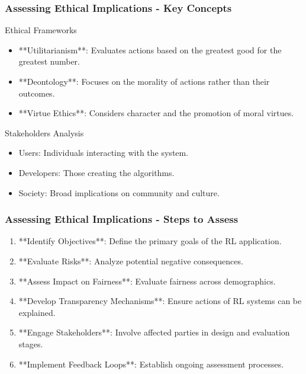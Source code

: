 \documentclass{beamer}
\begin{document}
\begin{frame}[fragile]
    \frametitle{Assessing Ethical Implications - Key Concepts}
    \begin{block}{Ethical Frameworks}
        \begin{itemize}
            \item **Utilitarianism**: Evaluates actions based on the greatest good for the greatest number.
            \item **Deontology**: Focuses on the morality of actions rather than their outcomes.
            \item **Virtue Ethics**: Considers character and the promotion of moral virtues.
        \end{itemize}
    \end{block}
    
    \begin{block}{Stakeholders Analysis}
        \begin{itemize}
            \item Users: Individuals interacting with the system.
            \item Developers: Those creating the algorithms.
            \item Society: Broad implications on community and culture.
        \end{itemize}
    \end{block}
\end{frame}

\begin{frame}[fragile]
    \frametitle{Assessing Ethical Implications - Steps to Assess}
    \begin{enumerate}
        \item **Identify Objectives**: Define the primary goals of the RL application.
        \item **Evaluate Risks**: Analyze potential negative consequences.
        \item **Assess Impact on Fairness**: Evaluate fairness across demographics.
        \item **Develop Transparency Mechanisms**: Ensure actions of RL systems can be explained.
        \item **Engage Stakeholders**: Involve affected parties in design and evaluation stages.
        \item **Implement Feedback Loops**: Establish ongoing assessment processes.
    \end{enumerate}
\end{frame}
\end{document}
